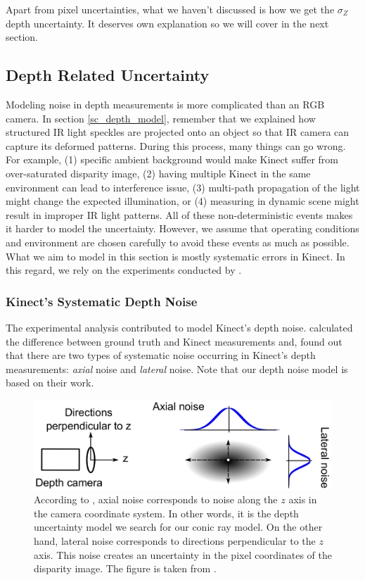 \documentclass[a4paper]{report}
\numberwithin{figure}{section}
\begin{document}
Apart from pixel uncertainties, what we haven't discussed is how we get the
$\sigma_Z$ depth uncertainty.  It deserves own explanation so we will cover in
the next section.

\subsection{Depth Related Uncertainty} \label{sb_sc_depth_uncertainty}

Modeling noise in depth measurements is more complicated than an RGB camera.
In section \ref{sc_depth_model}, remember that we explained how structured IR
light speckles are projected onto an object so that IR camera can capture its
deformed patterns.  During this process, many things can go wrong. For example,
(1) specific ambient background would make Kinect suffer from over-saturated
disparity image, (2) having multiple Kinect in the same environment can lead to
interference issue, (3) multi-path propagation of the light might change the
expected illumination, or (4) measuring in dynamic scene might result in
improper IR light patterns. All of these non-deterministic events makes it
harder to model the uncertainty. However, we assume that operating conditions
and environment are chosen carefully to avoid these events as much as possible.
What we aim to model in this section is mostly systematic errors in Kinect. In
this regard, we rely on the experiments conducted by \parencite{Nguyen2012a}. 

\subsubsection{Kinect's Systematic Depth Noise}

The experimental analysis contributed to model Kinect's depth noise.
\parencite{Nguyen2012a} calculated the difference between ground truth and 
Kinect
measurements and,  found out that there are two types of systematic noise
occurring in Kinect's depth measurements: \textit{axial} noise and
\textit{lateral} noise.  Note that our depth noise model is based on their
work.


\begin{figure}[H] \centering
\includegraphics[width=0.7\linewidth,natwidth=640,natheight=640]
{fig/ref_imgs/kinect_noise_model.png} \caption[Kinect's Depth Noise
Model]{According to \parencite{Nguyen2012a}, axial noise corresponds to noise 
along
the $z$ axis in the camera coordinate system. In other words, it is the depth
uncertainty model we search for our conic ray model.  On the other hand,
lateral noise corresponds to directions perpendicular to the $z$ axis. This
noise creates an uncertainty in the pixel coordinates of the disparity image.
The figure is taken from \parencite{Nguyen2012a}.} 
\label{fig:kinect_noise_model}
\end{figure}
\end{document}
